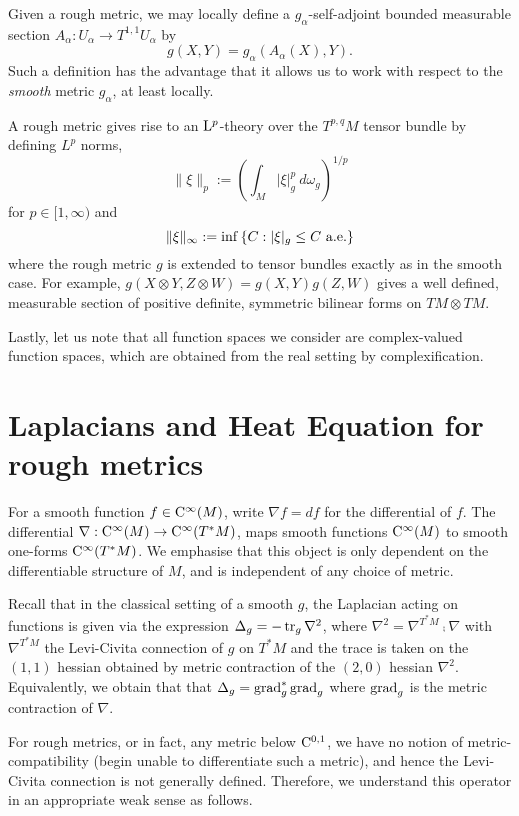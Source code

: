 \documentclass[a4paper, 12pt]{amsart}
\begin{document}
Given a rough metric, we may locally define a \(g_{\alpha}\)-self-adjoint bounded measurable section \(A_{\alpha} : U_{\alpha} \to T^{1,1}U_{\alpha}\) by
\[
g(X, Y) = g_{\alpha} (A_{\alpha} (X), Y).
\]
Such a definition has the advantage that it allows us to work with respect to the \emph{smooth} metric \(g_{\alpha}\), 
at least locally.

A rough metric gives rise to an ${\rm L}^{p}_{\rm {}}$-theory over the $T^{p,q}M$ tensor bundle by defining \(L^p\) norms,
\[
\|\xi\|_p := \left(\int_{M} |\xi|_{g}^p\ d\omega_g\right)^{1/p}
\]
for $p \in [1, \infty)$ and
\[
\|\xi\|_{\infty} := \inf\left\{C: |\xi|_g \leq C\ \text{a.e.}\right\}
\]
where the rough metric \(g\) is extended to tensor bundles exactly as in the smooth case. For example, \(g(X \otimes Y, Z \otimes W) = g(X, Y) g(Z, W)\) gives a well defined, measurable section of positive definite, symmetric bilinear forms on \(TM \otimes TM\).

Lastly, let us note that all function spaces we consider are complex-valued function spaces, which are obtained from the real setting by complexification.


\section{Laplacians and Heat Equation for rough metrics}


For a smooth function \(f \in {\rm C}^{\infty}_{\rm {}}(M)\), write \(\nabla f = df\) for the differential of \(f\). 
The differential \(\nabla : {\rm C}^{\infty}_{\rm {}}(M) \to {\rm C}^{\infty}_{\rm {}}(T^{\ast} M)\), maps smooth functions 
\({\rm C}^{\infty}_{\rm {}}(M)\) to smooth one-forms \({\rm C}^{\infty}_{\rm {}}(T^{\ast} M)\). 
We emphasise that this object is only dependent on the differentiable structure of $M$, and is independent of any choice of metric.

Recall that in the classical setting of a smooth $g$,  the Laplacian acting on functions is given  via the expression $\Delta_g = - \operatorname{tr}_g \nabla^2$, where $\nabla^2 = \nabla^{T^\ast M} \comp \nabla$
with $\nabla^{T^\ast M}$ the Levi-Civita connection of $g$ on \(T^{\ast} M\) and the trace is taken on the \((1,1)\) hessian obtained by metric contraction of the \((2, 0)\) hessian \(\nabla^2\). Equivalently, we obtain that  that \(\Delta_g = \operatorname{grad}_g^\ast \operatorname{grad}_g\) where \(\operatorname{grad}_g\) is the metric contraction of \(\nabla\).

For rough metrics, or in fact, any metric below ${\rm C}^{0,1}_{\rm {}}$, we have no notion of metric-compatibility (begin unable to differentiate such a metric), and hence the Levi-Civita connection is not generally defined. Therefore, we understand this operator in an appropriate weak sense as follows. 
\end{document}
